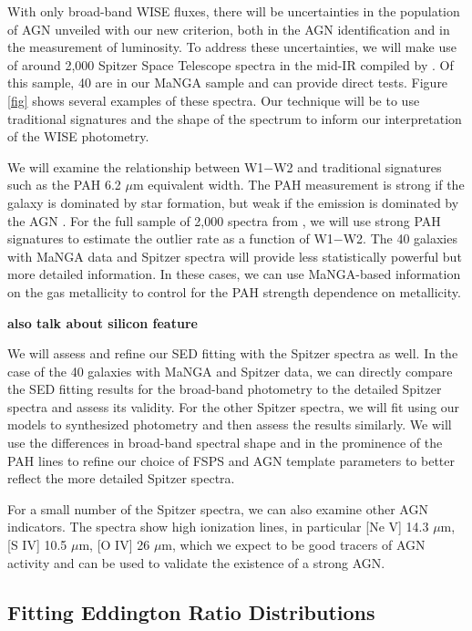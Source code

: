 \documentclass[12pt, preprint]{hacked-aastex}
\begin{document}
With only broad-band WISE fluxes, there will be uncertainties in 
the population of AGN unveiled with our new criterion, both in the 
AGN identification and in the measurement of luminosity. To address 
these uncertainties, we will make use of around 2,000 Spitzer Space Telescope
spectra in the mid-IR compiled by \cite{lambrides}. Of this sample, 40 
are in our MaNGA sample and can provide direct tests. 
Figure \ref{fig} shows several examples of these spectra.
Our technique will
be to use traditional signatures and the shape of the spectrum to 
inform our interpretation of the WISE photometry.

We will examine the relationship between W1$-$W2 and traditional
signatures such as the PAH 6.2 $\mu$m equivalent width. The PAH
measurement is strong if the galaxy is dominated by star formation,
but weak if the emission is dominated by the AGN \cite{sajina22a}.
For the full sample of 2,000 spectra from \cite{lambrides}, we will
use strong PAH signatures to estimate the outlier rate as a function
of W1$-$W2.  The 40 galaxies with MaNGA data and Spitzer spectra will
provide less statistically powerful but more detailed information. In
these cases, we can use MaNGA-based information on the gas metallicity
to control for the PAH strength dependence on metallicity.

{\bf also talk about silicon feature}

We will assess and refine our SED fitting with the Spitzer spectra as
well.  In the case of the 40 galaxies with MaNGA and Spitzer data, we
can directly compare the SED fitting results for the broad-band
photometry to the detailed Spitzer spectra and assess its
validity. For the other Spitzer spectra, we will fit using our models
to synthesized photometry and then assess the results similarly. We
will use the differences in broad-band spectral shape and in the
prominence of the PAH lines to refine our choice of FSPS and AGN
template parameters to better reflect the more detailed Spitzer
spectra.

For a small number of the Spitzer spectra, we can also examine other
AGN indicators. The spectra show high ionization lines, in particular
[Ne V] 14.3 $\mu$m, [S IV] 10.5 $\mu$m, [O IV] 26 $\mu$m, which we
expect to be good tracers of AGN activity and can be used to validate
the existence of a strong AGN.

\subsection{Fitting Eddington Ratio Distributions}
\label{sec:erd}
\end{document}
